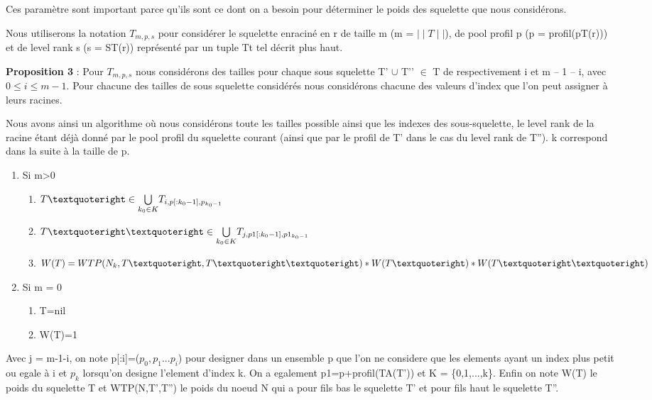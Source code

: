 \documentclass[french]{article}
\begin{document}
Ces paramètre sont important parce qu'ils sont ce dont on a besoin pour déterminer le poids des squelette que nous considérons.

Nous utiliserons la notation \(T_{m,p,s} \) pour considérer le squelette enraciné en r de taille m (m =  \(\mid\mid T\mid\mid\)), de pool profil p (p = profil(pT(r))) et de level rank s (s = ST(r)) représenté par un tuple Tt tel décrit plus haut.


\textbf{Proposition 3} :  Pour \(T_{m,p,s} \) nous considérons des tailles pour chaque sous squelette T’ \(\cup\) T’’ \(\in\) T de respectivement i et m – 1 – i, avec \(0\leq i\leq m-1\). Pour chacune des tailles de sous squelette considérés nous considérons chacune des valeurs d'index que l'on peut assigner à leurs racines.

Nous avons ainsi un algorithme où nous considérons toute les tailles possible ainsi que les indexes des sous-squelette, le level rank de la racine étant déjà donné par le pool profil du squelette courant (ainsi que par le profil de T' dans le cas du level rank de T''). k correspond dans la suite à la taille de p.

\begin{enumerate}
    \item Si m>0
        \begin{enumerate}
            \item
            \(T\textquoteright \in \underset{k_0\in K}{\bigcup} T_{i,p[:k_0-1],p_{k_0-1}} \)
            \item
            \(T\textquoteright\textquoteright \in \underset{k_0\in K}{\bigcup} T_{j,p1[:k_0-1],p1_{k_0-1}} \)
            \item
            \(W(T)=WTP(N_k,T\textquoteright,T\textquoteright\textquoteright)*W(T\textquoteright)*W(T\textquoteright\textquoteright)\)
        \end{enumerate}
 
    \item Si m = 0
        \begin{enumerate} 
            \item
            T=nil 
            \item
            W(T)=1
        \end{enumerate}
\end{enumerate}
Avec j = m-1-i, on note p[:i]=(\(p_0,p_1...p_i\)) pour designer dans un ensemble p que l'on ne considere que les elements ayant un index plus petit ou egale à i et \(p_{k}\) lorsqu'on designe l'element d'index k. On a egalement p1=p+profil(TA(T')) et K = \{0,1,...,k\}. Enfin on note W(T) le poids du squelette T et WTP(N,T',T'') le poids du noeud N qui a pour fils bas le squelette T' et pour fils haut le squelette T''.
\vspace{5mm} 
\end{document}
